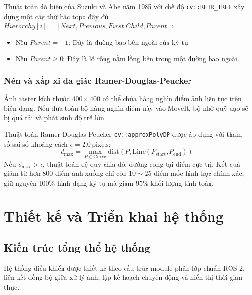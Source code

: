 \documentclass[a4paper,12pt]{article}
\begin{document}
Thuật toán dò biên của Suzuki và Abe năm 1985 với chế độ \texttt{cv::RETR\_TREE} xây dựng một cây thứ bậc topo đầy đủ $Hierarchy[i] = [Next, Previous, First\_Child, Parent]$:
\begin{itemize}[noitemsep]
    \item Nếu $Parent = -1$: Đây là đường bao bên ngoài của ký tự.
    \item Nếu $Parent \ge 0$: Đây là lỗ rỗng nằm lồng bên trong một đường bao ngoài.
\end{itemize}

\subsubsection{Nén và xấp xỉ đa giác Ramer-Douglas-Peucker}
Ảnh raster kích thước $400 \times 400$ có thể chứa hàng nghìn điểm ảnh liên tục trên biên dạng. Nếu đưa toàn bộ hàng nghìn điểm này vào MoveIt, bộ nhớ quỹ đạo sẽ bị quá tải và phát sinh độ trễ lớn.

Thuật toán Ramer-Douglas-Peucker \texttt{cv::approxPolyDP} được áp dụng với tham số sai số khoảng cách $\epsilon = 2.0\,\text{pixels}$:
\begin{equation}
d_{\max} = \max_{P \in \text{Curve}} \text{dist}(P, \text{Line}(P_{\text{start}}, P_{\text{end}}))
\end{equation}
Nếu $d_{\max} > \epsilon$, thuật toán đệ quy chia đôi đường cong tại điểm cực trị. Kết quả giảm từ hơn 800 điểm ảnh xuống chỉ còn $10 \sim 25$ điểm mốc hình học chính xác, giữ nguyên 100\% hình dạng ký tự mà giảm $95\%$ khối lượng tính toán.

\section{Thiết kế và Triển khai hệ thống}

\subsection{Kiến trúc tổng thể hệ thống}

Hệ thống điều khiển được thiết kế theo cấu trúc module phân lớp chuẩn ROS 2, liên kết đồng bộ giữa xử lý ảnh, lập kế hoạch chuyển động và hiển thị thời gian thực.
\end{document}
